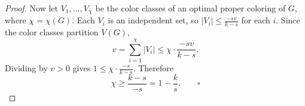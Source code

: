 \begin{proof}
Now let $V_{1},\dots,V_{\chi}$ be the color classes of an optimal proper coloring of $G$, where $\chi=\chi(G)$. Each $V_{i}$ is an independent set, so $|V_{i}|\le \frac{-sv}{k-s}$ for each $i$. Since the color classes partition $V(G)$,
\[
v=\sum_{i=1}^{\chi}|V_{i}|\le\chi\cdot\frac{-sv}{k-s}.
\]
Dividing by $v>0$ gives $1\le \chi\cdot\frac{-s}{k-s}$. Therefore
\[
\chi\ge\frac{k-s}{-s}=1-\frac{k}{s}.\qquad\square
\]
\end{proof}
